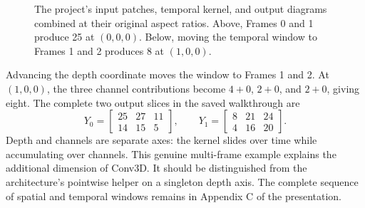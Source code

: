 \begin{figure}[htbp]
\centering

\caption[Two temporal positions of the Conv3D window]{The project's input
patches, temporal kernel, and output diagrams combined at their original
aspect ratios. Above, Frames 0 and 1 produce 25 at $(0,0,0)$. Below, moving
the temporal window to Frames 1 and 2 produces 8 at $(1,0,0)$.}
\label{fig:conv3d-example}
\end{figure}

Advancing the depth coordinate moves the window to Frames 1 and 2. At
$(1,0,0)$, the three channel contributions become $4+0$, $2+0$, and
$2+0$, giving eight. The complete two output slices in the saved
walkthrough are
\[
 Y_0=\begin{bmatrix}25&27&11\\14&15&5\end{bmatrix},\qquad
 Y_1=\begin{bmatrix}8&21&24\\4&16&20\end{bmatrix}.
\]
Depth and channels are separate axes: the kernel slides over time while
accumulating over channels. This genuine multi-frame example explains
the additional dimension of Conv3D. It should be distinguished from the
architecture's pointwise helper on a singleton depth axis. The complete
sequence of spatial and temporal windows remains in Appendix C of the
presentation.
